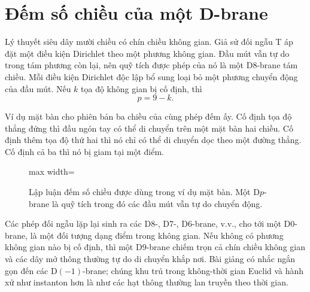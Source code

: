\section{Đếm số chiều của một D-brane}

Lý thuyết siêu dây mười chiều có chín chiều không gian. Giả sử đối ngẫu T áp đặt một điều kiện Dirichlet theo một phương không gian. Đầu mút vẫn tự do trong tám phương còn lại, nên quỹ tích được phép của nó là một D8-brane tám chiều. Mỗi điều kiện Dirichlet độc lập bổ sung loại bỏ một phương chuyển động của đầu mút. Nếu \(k\) tọa độ không gian bị cố định, thì
\begin{equation}
  p=9-k.
  \label{eq:l10-dp-counting}
\end{equation}

Ví dụ mặt bàn cho phiên bản ba chiều của cùng phép đếm ấy. Cố định tọa độ thẳng đứng thì đầu ngón tay có thể di chuyển trên một mặt bàn hai chiều. Cố định thêm tọa độ thứ hai thì nó chỉ có thể di chuyển dọc theo một đường thẳng. Cố định cả ba thì nó bị giam tại một điểm.

\begin{figure}[H]
  \centering
  \begin{adjustbox}{max width=\linewidth}
  \end{adjustbox}
  \caption{Lập luận đếm số chiều được dùng trong ví dụ mặt bàn. Một D\(p\)-brane là quỹ tích trong đó các đầu mút vẫn tự do chuyển động.}
  \label{fig:l10-dp-counting-redraw}
\end{figure}

Các phép đối ngẫu lặp lại sinh ra các D8-, D7-, D6-brane, v.v., cho tới một D0-brane, là một đối tượng dạng điểm trong không gian. Nếu không có phương không gian nào bị cố định, thì một D9-brane chiếm trọn cả chín chiều không gian và các dây mở thông thường tự do di chuyển khắp nơi. Bài giảng có nhắc ngắn gọn đến các D\((-1)\)-brane; chúng khu trú trong không-thời gian Euclid và hành xử như instanton hơn là như các hạt thông thường lan truyền theo thời gian.

